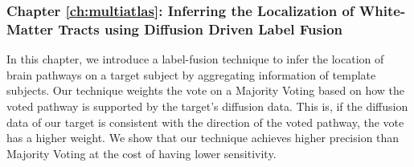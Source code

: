 \subsubsection{Chapter \ref{ch:multiatlas}: Inferring the Localization of White-Matter Tracts using Diffusion Driven Label Fusion}
In this chapter, we introduce a label-fusion technique to infer the location of
brain pathways on a target subject by aggregating information of template subjects.
Our technique weights the vote on a Majority Voting based on how the
voted pathway is supported by the target's diffusion data. This is, if the
diffusion data of our target is consistent with the direction of the voted pathway,
the vote has a higher weight. We show that
our technique achieves higher precision than Majority Voting at the cost of
having lower sensitivity.


